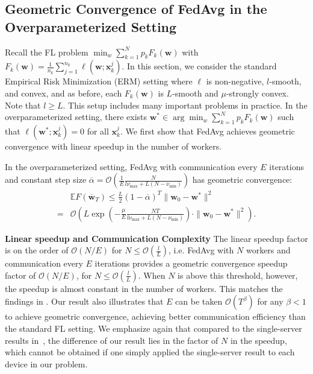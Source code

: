 \subsection{Geometric Convergence of FedAvg in the Overparameterized Setting}
Recall the FL problem $\min_{w}\sum_{k=1}^{N}p_{k}F_{k}(\mathbf{w})$
with $F_{k}(\mathbf{w})=\frac{1}{n_{k}}\sum_{j=1}^{n_{k}}\ell(\mathbf{w};\mathbf{x}_{k}^{j})$.
In this section, we consider the standard Empirical Risk Minimization (ERM) setting where $\ell$
is non-negative, $l$-smooth, and convex, and as before, each $F_{k}(\mathbf{w})$ is $L$-smooth and $\mu$-strongly convex. Note that $l\geq L$. This
setup includes many important problems in practice. In the overparameterized
setting, there exists $\mathbf{w}^{\ast}\in\arg\min_{w}\sum_{k=1}^{N}p_{k}F_{k}(\mathbf{w})$
such that $\ell(\mathbf{w}^{\ast};\mathbf{x}_{k}^{j})=0$ for all
$\mathbf{x}_{k}^{j}$. We first show that FedAvg achieves geometric convergence
with linear speedup in the number of workers. 
\begin{theorem}
	\label{thm:overparameterized_general}In the overparameterized setting,
	FedAvg with communication every $E$ iterations
	and constant step size $\overline{\alpha}=\mathcal{O}(\frac{1}{E}\frac{N}{l\nu_{\max}+L(N-\nu_{\min})})$
	has geometric convergence:
	\begin{align*}
	&\mathbb{E}F(\overline{\mathbf{w}}_{T})  \leq\frac{L}{2}(1-\overline{\alpha})^{T}\|\mathbf{w}_{0}-\mathbf{w}^{\ast}\|^{2}\\
	=&\mathcal{O}\left(L\exp\left(-\frac{\mu}{E}\frac{NT}{l\nu_{\max}+L(N-\nu_{\min})}\right)\cdot\|\mathbf{w}_{0}-\mathbf{w}^{\ast}\|^{2}\right).
	\end{align*}
\end{theorem}
%
\textbf{Linear speedup and Communication Complexity} The linear speedup factor is on the order of $\mathcal{O}(N/E)$ %
for $N\leq\mathcal{O}(\frac{l}{L})$, i.e. FedAvg with $N$ workers and communication
every $E$ iterations provides a geometric convergence speedup factor
of $\mathcal{O}(N/E)$, for $N\leq\mathcal{O}(\frac{l}{L})$. When $N$ is above
this threshold, however, the speedup is almost constant in the number
of workers. This matches the findings in \cite{ma2017power}. Our
result also illustrates that $E$ can be taken $\mathcal{O}(T^{\beta})$
for any $\beta<1$ to achieve geometric convergence, achieving better communication efficiency than
the standard FL setting. We emphasize again that compared to the single-server results in~\cite{ma2017power}, the difference of our result lies in the factor of $N$ in the speedup, which cannot be obtained if one simply applied the single-server result to each device in our problem.

